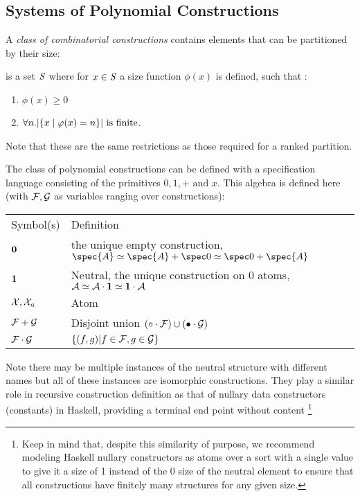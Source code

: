\subsection{Systems of Polynomial Constructions}
A \emph{class of combinatorial constructions} contains elements that 
can be partitioned by their size:

\begin{df}
is a set $\mathit{S}$ where for $x \in \mathit{S}$ a size function $\phi(x)$ is defined, 
such that :
\begin{enumerate}
\item $\phi(x) \ge 0$ 
\item $\forall n . \lvert \{ x \mid \varphi(x)=n \} \rvert \text{ is finite} $.
\end{enumerate}
\end{df}

\noindent
Note that these are the same restrictions as those required for a ranked partition.

The class of polynomial constructions can be 
defined with a specification language consisting of 
the primitives $0, 1, + \text{ and } x$.
This algebra is defined here
(with $\mathcal{F}, \mathcal{G}$ as variables ranging over constructions):

\begin{tabular}[b]{ll}
Symbol(s) &  Definition  \\
$\mathbf{0}$ & the unique empty construction, $ \spec{A} \siso \spec{A} \splus \spec0 \siso \spec0 \splus \spec{A} $\\
$\mathbf{1}$ & Neutral, the unique construction on 0 atoms, $ \mathcal{A} \simeq \mathcal{A} \cdot \mathbf{1} \simeq \mathbf{1} \cdot \mathcal{A} $ \\
$\mathcal{X}, \mathcal{X}_{a}$ & Atom \\
$\mathcal{F} + \mathcal{G}$ & Disjoint union $(\circ \cdot \mathcal{F}) \cup (\bullet \cdot \mathcal{G})$ \\
$\mathcal{F} \cdot \mathcal{G}$ & $\{ (f, g) \lvert f \in \mathcal{F}, g \in \mathcal{G} \}$ 
\end{tabular}

\noindent
Note there may be multiple instances of the neutral structure  with different names
but all of these instances are isomorphic constructions.
They play a similar role in recursive construction definition 
as that of nullary data constructors (constants) in Haskell,
providing a terminal end point without content%
\footnote{Keep in mind that, despite this similarity of purpose,
we recommend modeling Haskell nullary constructors
as atoms over a sort with a single value to give it a size of 1 instead of
the $0$ size of the neutral element
to ensure that all constructions have finitely many structures for any given size.}

